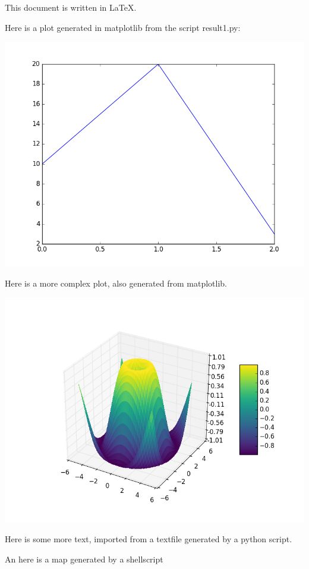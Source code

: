 \documentclass[11pt,a4paper]{article}
\author{Tobias Stål}
\begin{document}
This document is written in \LaTeX.

Here is a plot generated in matplotlib from the script result1.py:

\includegraphics[scale=0.5]{fig/plot1.png}

Here is a more complex plot, also generated from matplotlib. 

\includegraphics[scale=0.5]{fig/plot2.png}


Here is some more text, imported from a textfile generated by a python script. 



An here is a map generated by a shellscript
\end{document}
